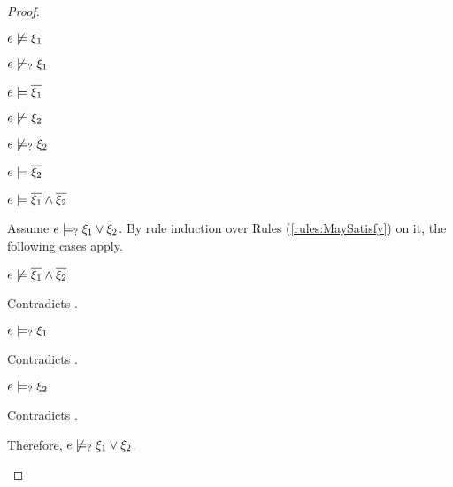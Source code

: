 \begin{proof}
\begin{byCases}
\begin{byCases}
        \begin{pfsteps*}
        \item $e \not\models \xi_1$  
        \item $e \not\models_{?} \xi_1$  
        \item $e \models \overline{\xi_1}$  
        \item $e \not\models \xi_2$  
        \item $e \not\models_{?} \xi_2$  
        \item $e \models \overline{\xi_2}$  
        \item $e \models \overline{\xi_1} \wedge \overline{\xi_2}$  
        \end{pfsteps*}
        Assume $e \models_{?} \xi_1 \vee \xi_2$. By rule induction over Rules (\ref{rules:MaySatisfy}) on it, the following cases apply.
        \begin{byCases}
        \item[\text{(\ref{rule:CMSNotVal})}]
            \begin{pfsteps*}
            \item $e \not\models \overline{\xi_1} \wedge \overline{\xi_2}$ 
            \end{pfsteps*}
            Contradicts .
        \item[\text{(\ref{rule:CMSOr1})}]
            \begin{pfsteps*}
            \item $e \models_{?} \xi_1$ 
            \end{pfsteps*}
            Contradicts .
        \item[\text{(\ref{rule:CMSOr2})}]
            \begin{pfsteps*}
            \item $e \models_{?} \xi_2$ 
            \end{pfsteps*}
            Contradicts .
        \end{byCases}
        Therefore, $e \not\models_{?} \xi_1 \vee \xi_2$.
        

\end{byCases}
\end{byCases}
\end{proof}
